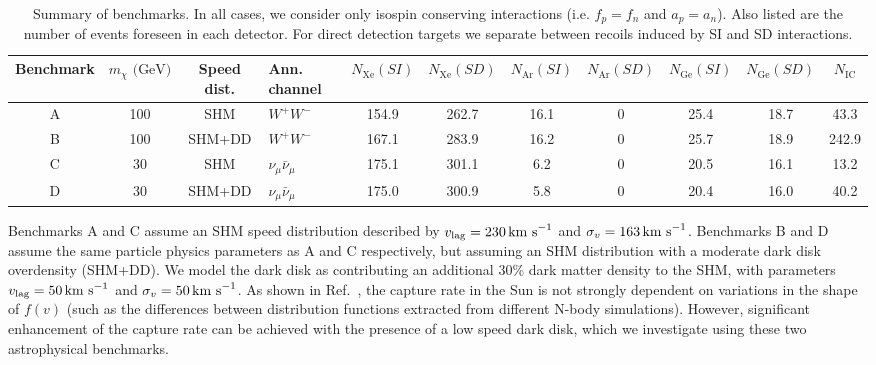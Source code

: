 \begin{table}[pht!]
  \setlength{\extrarowheight}{3pt}
  \begin{center}
\begin{sideways}
	\begin{tabular}{c|ccm{2cm}|ccccccc}
        \hline\hline
	Benchmark & $m_\chi \textrm{ (GeV)}$ & Speed dist. & Ann. channel & $N_{\mathrm{Xe}}(SI)$ & $N_{\mathrm{Xe}}(SD)$  & $N_{\mathrm{Ar}}(SI)$ & $N_{\mathrm{Ar}}(SD)$ & $N_{\textrm{Ge}}(SI)$ & $N_{\textrm{Ge}}(SD)$ & $N_{\textrm{IC}}$ \\
	\hline
        A & 100 & SHM & $W^{+}W^{-}$ & 154.9 & 262.7 & 16.1 & 0 & 25.4 & 18.7 & 43.3\\
        B & 100 & SHM+DD & $W^{+}W^{-}$ & 167.1 & 283.9 & 16.2 & 0 & 25.7 & 18.9 & 242.9\\
        C & 30  & SHM & $\nu_\mu \bar{\nu}_\mu$ & 175.1 & 301.1 & 6.2 & 0 & 20.5 & 16.1 & 13.2\\
        D & 30  & SHM+DD & $\nu_\mu \bar{\nu}_\mu$ & 175.0 & 300.9 & 5.8 & 0 & 20.4 & 16.0 & 40.2\\
        \hline\hline
	\end{tabular}
\end{sideways}
  \end{center}
\caption[Summary of benchmarks used in Chapter~\ref{ch:NT}]{Summary of benchmarks. In all cases, we consider only isospin conserving interactions (i.e. $f_p = f_n$ and $a_p = a_n$). Also listed are the number of events foreseen in each detector. For direct detection targets we separate between recoils induced by SI and SD interactions.}
\label{tab:NT:benchmarks}
\end{table}

Benchmarks A and C assume an SHM speed distribution described by $v_\textrm{lag} = 230 \,\textrm{km s}^{-1}$ and $\sigma_v = 163 \,\textrm{km s}^{-1}$. Benchmarks B and D assume the same particle physics parameters as A and C respectively, but assuming an SHM distribution with a moderate dark disk overdensity (SHM+DD). We model the dark disk as contributing an additional 30\% dark matter density to the SHM, with parameters $v_\textrm{lag} = 50 \,\textrm{km s}^{-1}$ and $\sigma_v = 50 \,\textrm{km s}^{-1}$. As shown in Ref.~\cite{Choi:2013}, the capture rate in the Sun is not strongly dependent on variations in the shape of $f(v)$ (such as the differences between distribution functions extracted from different N-body simulations). However, significant enhancement of the capture rate can be achieved with the presence of a low speed dark disk, which we investigate using these two astrophysical benchmarks.


